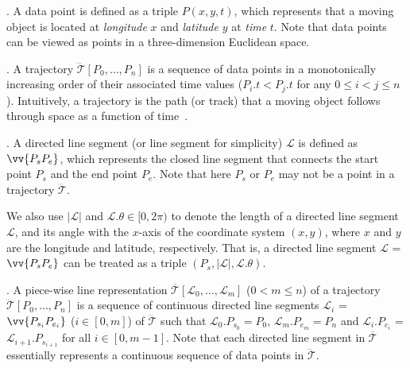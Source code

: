 . A data point is defined as a triple $P(x, y, t)$, which represents that a moving object is located at {\em longitude} $x$ and {\em latitude} $y$ at {\em time} $t$. Note that data points can be viewed as points in a three-dimension Euclidean space.

. A trajectory $\dddot{\mathcal{T}}[P_0, \ldots, P_n]$ is a sequence of data points in a monotonically increasing order of their associated time values (\ie $P_i.t < P_j.t$ for any $0\le i<j\le n$). Intuitively, a trajectory is the path (or track) that a moving object follows through space as a function of time~\cite{physics-trajectory}.


. A directed line segment (or line segment for simplicity) $\mathcal{L}$ is defined as $\vv{P_{s}P_{e}}$, which represents the closed line segment that connects the start point $P_s$ and the end point $P_e$.
Note that here $P_s$ or $P_e$ may not be a point in a trajectory $\dddot{\mathcal{T}}$.


We also use $|\mathcal{L}|$ and $\mathcal{L}.\theta\in [0, 2\pi)$ to denote the length of a directed line segment $\mathcal{L}$, and its angle with the $x$-axis of the coordinate system $(x, y)$, where $x$ and $y$ are the longitude and latitude, respectively.
That is, a directed line segment $\mathcal{L}$ = $\vv{P_{s}P_{e}}$ can be treated as a triple $(P_s, |\mathcal{L}|, \mathcal{L}.\theta)$.

. A piece-wise line representation $\overline{\mathcal{T}}[\mathcal{L}_0, \ldots , \mathcal{L}_m]$ ($0< m \le n$) of a trajectory $\dddot{\mathcal{T}}[P_0, \ldots, P_n]$ is a sequence of continuous directed line segments $\mathcal{L}_{i}$ = $\vv{P_{s_i}P_{e_i}}$ ($i\in[0,m]$) of $\dddot{\mathcal{T}}$  such that $\mathcal{L}_{0}.P_{s_0} = P_0$, $\mathcal{L}_{m}.P_{e_m} = P_n$ and  $\mathcal{L}_{i}.P_{e_i}$ = $\mathcal{L}_{i+1}.P_{s_{i+1}}$ for all $i\in[0, m-1]$. Note that each directed line segment in $\overline{\mathcal{T}}$ essentially represents a continuous sequence of data points in $\dddot{\mathcal{T}}$.


